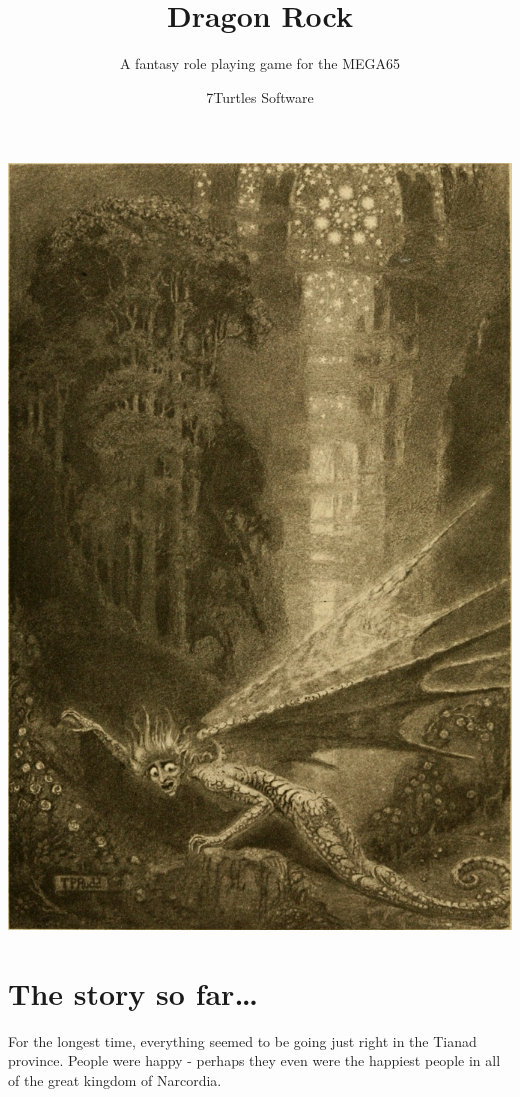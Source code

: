 \documentclass[12pt]{scrbook}
\begin{document}
\title{Dragon Rock}
\subtitle{A fantasy role playing game for the MEGA65}
\author{7Turtles Software}
\maketitle

\includegraphics[width=\textwidth]{illustrations/ddungeon}


\chapter*{The story so far\dots}

For the longest time, everything seemed to be going just right in the Tianad province. People were happy - perhaps they even were the happiest people in all of the great kingdom of Narcordia.
\end{document}
